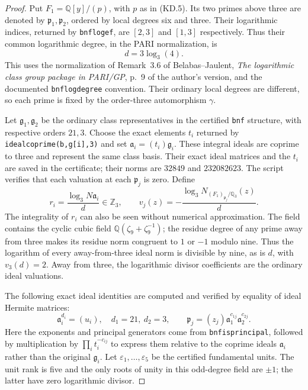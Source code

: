 \begin{proof}
Put $F_1=\mathbb Q[y]/(p)$, with $p$ as in (KD.5).
Its two primes above three are denoted by $\mathfrak p_1,
\mathfrak p_2$, ordered by local degrees six and three.
Their logarithmic indices, returned by \texttt{bnflogef}, are
$[2,3]$ and $[1,3]$ respectively.
Thus their common logarithmic degree, in the PARI
normalization, is
\[
                          d=3\log_3(4).               \tag{K23.4}
\]
This uses the normalization of Remark~3.6 of
Belabas--Jaulent, \emph{The logarithmic class group package
in PARI/GP}, p.~9 of the author's version, and the documented
\texttt{bnflogdegree} convention.
Their ordinary local degrees are different, so each prime
is fixed by the order-three automorphism $\gamma$.

Let $\mathfrak g_1,\mathfrak g_2$ be the ordinary class
representatives in the certified \texttt{bnf} structure,
with respective orders $21,3$.
Choose the exact elements $t_i$ returned by
\texttt{idealcoprime(b,g[i],3)} and set
$\mathfrak a_i=(t_i)\mathfrak g_i$.
These integral ideals are coprime to three and represent
the same class basis.  Their exact ideal matrices and the
$t_i$ are saved in the certificate; their norms are
$32849$ and $232082623$.
The script verifies that each valuation at each
$\mathfrak p_j$ is zero.
Define
\[
 r_i=\frac{\log_3 N\mathfrak a_i}{d}\in\mathbb Z_3,
 \qquad
 v_j(z)=-\frac{\log_3N_{(F_1)_{\mathfrak p_j}/\mathbb Q_3}(z)}d.
                                                        \tag{K23.5}
\]
The integrality of $r_i$ can also be seen without numerical
approximation.  The field contains the cyclic cubic field
$\mathbb Q(\zeta_9+\zeta_9^{-1})$; the residue degree of
any prime away from three makes its residue norm congruent
to $1$ or $-1$ modulo nine.  Thus the logarithm of every
away-from-three ideal norm is divisible by nine,
as is $d$, with $v_3(d)=2$.
Away from three, the logarithmic divisor coefficients
are the ordinary ideal valuations.

The following exact ideal identities are computed and
verified by equality of ideal Hermite matrices:
\[
 \mathfrak a_i^{d_i}=(u_i),\quad d_1=21,\ d_2=3,
 \qquad
 \mathfrak p_j=(z_j)\mathfrak a_1^{c_{1j}}
                              \mathfrak a_2^{c_{2j}}.
                                                        \tag{K23.6}
\]
Here the exponents and principal generators come from
\texttt{bnfisprincipal}, followed by multiplication by
$\prod_i t_i^{-c_{ij}}$ to express them relative to the
coprime ideals $\mathfrak a_i$ rather than the original
$\mathfrak g_i$.
Let $\varepsilon_1,\ldots,\varepsilon_5$ be the certified
fundamental units.  The unit rank is five and the only
roots of unity in this odd-degree field are $\pm1$;
the latter have zero logarithmic divisor.


\end{proof}
